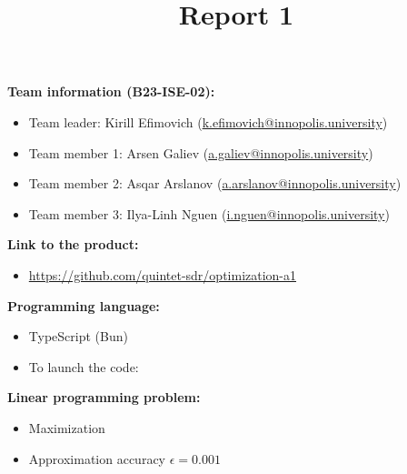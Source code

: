 \documentclass{article}
\title{\textbf{Report 1}}
\author{}
\date{}
\begin{document}
\maketitle

\thispagestyle{fancy}

\textbf{Team information (B23-ISE-02):}
\begin{itemize}
    \item Team leader: Kirill Efimovich (\href{mailto:k.efimovich@innopolis.university}{k.efimovich@innopolis.university})
    \item Team member 1: Arsen Galiev (\href{mailto:a.galiev@innopolis.university}{a.galiev@innopolis.university})
    \item Team member 2: Asqar Arslanov (\href{mailto:a.arslanov@innopolis.university}{a.arslanov@innopolis.university})
    \item Team member 3: Ilya-Linh Nguen (\href{mailto:i.nguen@innopolis.university}{i.nguen@innopolis.university})
\end{itemize}

\vspace{0.25in}

\textbf{Link to the product:}
\begin{itemize}
    \item \url{https://github.com/quintet-sdr/optimization-a1}
\end{itemize}

\vspace{0.25in}

\textbf{Programming language:}
\begin{itemize}
    \item TypeScript (Bun)
    \item To launch the code: 
\end{itemize}

\vspace{0.25in}

\textbf{Linear programming problem:}
\begin{itemize}
    \item Maximization
    \item Approximation accuracy \(\epsilon = 0.001\)
\end{itemize}

\vspace{0.25in}
\end{document}
